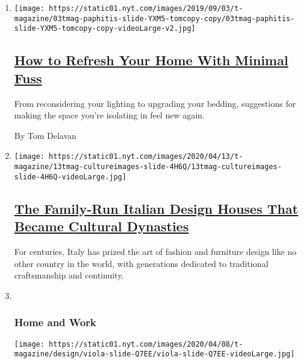 \begin{enumerate}
\def\labelenumi{\arabic{enumi}.}
\item
  \texttt{[image: https://static01.nyt.com/images/2019/09/03/t-magazine/03tmag-paphitis-slide-YXM5-tomcopy-copy/03tmag-paphitis-slide-YXM5-tomcopy-copy-videoLarge-v2.jpg]}

  \hypertarget{how-to-refresh-your-home-with-minimal-fuss}{%
  \subsection{\texorpdfstring{\href{/2020/05/21/t-magazine/redecorate-home-coronavirus.html}{How
  to Refresh Your Home With Minimal
  Fuss}}{How to Refresh Your Home With Minimal Fuss}}\label{how-to-refresh-your-home-with-minimal-fuss}}

  From reconsidering your lighting to upgrading your bedding,
  suggestions for making the space you're isolating in feel new again.

  By Tom Delavan
\item
  \texttt{[image: https://static01.nyt.com/images/2020/04/13/t-magazine/13tmag-cultureimages-slide-4H6Q/13tmag-cultureimages-slide-4H6Q-videoLarge.jpg]}

  \hypertarget{the-family-run-italian-design-houses-that-became-cultural-dynasties}{%
  \subsection{\texorpdfstring{\href{/interactive/2020/04/13/t-magazine/italian-fashion-design-houses.html}{The
  Family-Run Italian Design Houses That Became Cultural
  Dynasties}}{The Family-Run Italian Design Houses That Became Cultural Dynasties}}\label{the-family-run-italian-design-houses-that-became-cultural-dynasties}}

  For centuries, Italy has prized the art of fashion and furniture
  design like no other country in the world, with generations dedicated
  to traditional craftsmanship and continuity.
\item ~
  \hypertarget{home-and-work}{%
  \subsubsection{Home and Work}\label{home-and-work}}

  \texttt{[image: https://static01.nyt.com/images/2020/04/08/t-magazine/design/viola-slide-Q7EE/viola-slide-Q7EE-videoLarge.jpg]}

  \hypertarget{a-designer-whose-home-is-as-fanciful-as-her-plaster-creations}{%
}
\end{enumerate}
